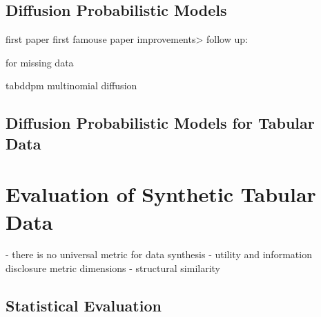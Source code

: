 \subsection{Diffusion Probabilistic Models}
\label{ch:preliminaries-generativeAlgorithms-diffusionProbabilisticModels}

first paper \cite{sohl-dickstein2015DeepUnsupervisedLearning}
first famouse paper \cite{ho2020DenoisingDiffusionProbabilistic}
improvements> \cite{nichol2021ImprovedDenoisingDiffusion}
follow up: \cite{dhariwal2021DiffusionModelsBeat}

\cite{ho2022ClassifierFreeDiffusionGuidance}

\cite{rombach2022HighResolutionImageSynthesis}



\cite{zheng2022DiffusionModelsMissing} for missing data

\cite{kotelnikov2022TabDDPMModellingTabular} tabddpm
\cite{hoogeboom2021ArgmaxFlowsMultinomial} multinomial diffusion


\subsection{Diffusion Probabilistic Models for Tabular Data}
\label{ch:preliminaries-generativeAlgorithms-diffusionProbabilisticModelsTabularData}



\section{Evaluation of Synthetic Tabular Data}
\label{ch:preliminaries-evaluationOfSyntheticTabularData}

- there is no universal metric for data synthesis \cite{hernandez2022SyntheticDataGeneration}
- utility and information disclosure metric dimensions \cite{goncalves2020GenerationEvaluationSynthetic}
- structural similarity \cite{elemam2020SevenWaysEvaluate}

\subsection{Statistical Evaluation}
\label{ch:preliminaries-evaluationOfSyntheticTabularData-statisticalEvaluation}

